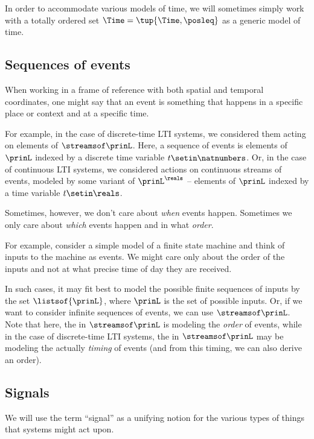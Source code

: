 In order to accommodate various models of time, we will sometimes simply work with a totally ordered set $\Time = \tup{\Time, \posleq}$ as a generic model of time.

\subsection{Sequences of events}

When working in a frame of reference with both spatial and temporal coordinates, one might say that an event is something that happens in a specific place or context and at a specific time.

For example, in the case of discrete-time LTI systems, we considered them acting on elements of $\streamsof\prinL$.
Here, a sequence of events is elements of $\prinL$ indexed by a discrete time variable $t \setin \natnumbers$.
Or, in the case of continuous LTI systems, we considered actions on continuous streams of events, modeled by some variant of $\prinL^{\reals}$ -- elements of $\prinL$ indexed by a time variable $t \setin \reals$.

Sometimes, however, we don't care about \emph{when} events happen.
Sometimes we only care about \emph{which} events happen and in what \emph{order}.

For example, consider a simple model of a finite state machine and think of inputs to the machine as events.
We might care only about the order of the inputs and not at what precise time of day they are received.

In such cases, it may fit best to model the possible finite sequences of inputs by the set $\listsof{\prinL}$, where $\prinL$ is the set of possible inputs.
Or, if we want to consider infinite sequences of events, we can use $\streamsof\prinL$.
Note that here, the \natnumbers in $\streamsof\prinL$ is modeling the \emph{order} of events, while in the case of discrete-time LTI systems, the \natnumbers in $\streamsof\prinL$ may be modeling the actually \emph{timing} of events (and from this timing, we can also derive an order).

\subsection{Signals}

We will use the term ``signal'' as a unifying notion for the various types of things that systems might act upon.


